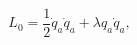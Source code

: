 \begin{equation}
L_{0}=\frac{1}{2}\dot{q}_{a}\dot{q}_{a}+\lambda q_{a}\dot{q}_{a},
\label{lag}
\end{equation}

